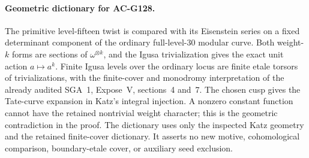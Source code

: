 \paragraph{Geometric dictionary for AC-G128.}
The primitive level-fifteen twist is compared with its Eisenstein series
on a fixed determinant component of the ordinary full-level-$30$ modular
curve.  Both weight-$k$ forms are sections of $\omega^{\otimes k}$,
and the Igusa trivialization gives the exact unit action $a\mapsto a^k$.
Finite Igusa levels over the ordinary locus are finite etale torsors of
trivializations, with the finite-cover and monodromy interpretation of
the already audited SGA~1, Expose~V, sections~4 and~7.  The chosen cusp
gives the Tate-curve expansion in Katz's integral injection.  A nonzero
constant function cannot have the retained nontrivial weight character;
this is the geometric contradiction in the proof.  The dictionary uses
only the inspected Katz geometry and the retained finite-cover dictionary.
It asserts no new motive, cohomological comparison, boundary-etale cover,
or auxiliary seed exclusion.
